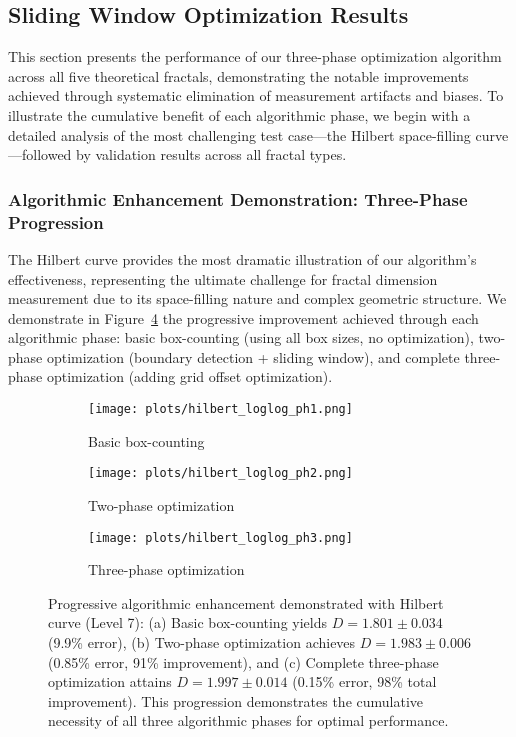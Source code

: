 \documentclass[preprint,12pt]{elsarticle}
\begin{document}
\subsection{Sliding Window Optimization Results}
\label{subsec:sliding_window_results}

This section presents the performance of our three-phase optimization algorithm across all five theoretical fractals, demonstrating the notable improvements achieved through systematic elimination of measurement artifacts and biases. To illustrate the cumulative benefit of each algorithmic phase, we begin with a detailed analysis of the most challenging test case—the Hilbert space-filling curve—followed by validation results across all fractal types.

\subsubsection{Algorithmic Enhancement Demonstration: Three-Phase Progression}

The Hilbert curve provides the most dramatic illustration of our algorithm's effectiveness, representing the ultimate challenge for fractal dimension measurement due to its space-filling nature and complex geometric structure. We demonstrate in Figure~\ref{fig:hilbert_progression} the progressive improvement achieved through each algorithmic phase: basic box-counting (using all box sizes, no optimization), two-phase optimization (boundary detection + sliding window), and complete three-phase optimization (adding grid offset optimization).

\begin{figure}[H]
\centering
\begin{subfigure}[b]{0.32\textwidth}
    \centering
    \texttt{[image: plots/hilbert\_loglog\_ph1.png]}
    \caption{Basic box-counting}
    \label{fig:hilbert_basic}
\end{subfigure}
\hfill
\begin{subfigure}[b]{0.32\textwidth}
    \centering
    \texttt{[image: plots/hilbert\_loglog\_ph2.png]}
    \caption{Two-phase optimization}
    \label{fig:hilbert_two_phase}
\end{subfigure}
\hfill
\begin{subfigure}[b]{0.32\textwidth}
    \centering
    \texttt{[image: plots/hilbert\_loglog\_ph3.png]}
    \caption{Three-phase optimization}
    \label{fig:hilbert_three_phase}
\end{subfigure}

\caption{Progressive algorithmic enhancement demonstrated with Hilbert curve (Level 7): (a) Basic box-counting yields $D = 1.801 \pm 0.034$ (9.9\% error), (b) Two-phase optimization achieves $D = 1.983 \pm 0.006$ (0.85\% error, 91\% improvement), and (c) Complete three-phase optimization attains $D = 1.997 \pm 0.014$ (0.15\% error, 98\% total improvement). This progression demonstrates the cumulative necessity of all three algorithmic phases for optimal performance.}
\label{fig:hilbert_progression}
\end{figure}
\end{document}
